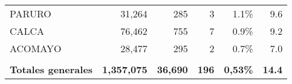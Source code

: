 \begin{tabular}{lrrrrr}
	\cellcolor[HTML]{FFFC9E}PARURO        & 31,264                                                         & 285                                                                             & 3                                                              & 1.1\%                                                                  & 9.6                                                                                                                                \\
	\cellcolor[HTML]{FFFC9E}CALCA         & 76,462                                                         & 755                                                                             & 7                                                              & 0.9\%                                                                  & 9.2                                                                                                                                \\
	\cellcolor[HTML]{FFFC9E}ACOMAYO       & 28,477                                                         & 295                                                                             & 2                                                              & 0.7\%                                                                  & 7.0                                                                                                                                \\
	&                                                                &                                                                                 &                                                                &                                                                        &                                                                                                                                    \\
	\rowcolor[HTML]{ECF4FF} 
	\textbf{Totales generales}            & \textbf{1,357,075}                                             & \textbf{36,690}                                                                 & \textbf{196}                                                   & \textbf{0,53\%}                                                        & \textbf{14.4}                                                                                                                     
\end{tabular}